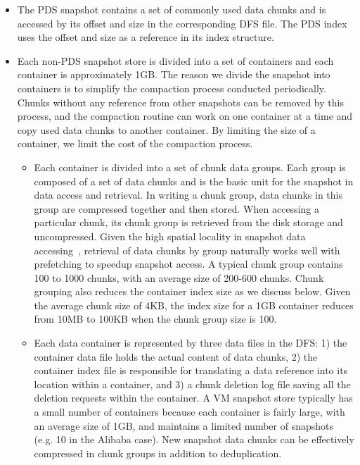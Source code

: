 \begin{itemize}
\item The PDS snapshot contains a set of commonly used data chunks and is accessed by its offset and size
in the corresponding DFS file.
The PDS index uses the offset and size as a reference in its index structure.
 
\item Each non-PDS snapshot store is divided into a set of containers and each container is approximately 
1GB. The reason we divide the snapshot into containers is to simplify the compaction process
conducted periodically. Chunks without any reference from other snapshots can be removed by this process, and the compaction  routine can work on one container at a time
and copy used data chunks to another container. By limiting the size of a container, we limit the cost of the compaction process.
	\begin{itemize}
	\item Each container is divided into a set of chunk data groups. Each group is composed of
	a set of data chunks and is the basic unit for the snapshot in data access and retrieval. 
	In writing a chunk group, data chunks in this group are compressed together and then stored. 
	When accessing a particular chunk, its chunk group is retrieved from the disk storage
	and uncompressed. Given the high spatial locality 
in snapshot data accessing~\cite{Sampling,FoundationPaper},
	retrieval of  data chunks by group naturally works well with prefetching to speedup
	snapshot access. A  typical chunk group contains 100 to 1000 chunks, with an average size of 
200-600 chunks.
Chunk grouping also reduces the  container index size as we discuss below. 
Given  the average chunk size of 4KB,  the index size for a 1GB container reduces from 10MB to 100KB when
the chunk group size is 100.
	\item 
Each data container is represented by three data files in the DFS:
1) the container data file holds the actual content of data chunks, 
2) the container index file is responsible for translating a data reference
into its location within a container, and 
3) a chunk deletion log file saving all the deletion requests within  the container.
A VM snapshot store typically has a small number of containers because each container is fairly large, with an average size of 1GB, and 
maintains a limited number of snapshots (e.g. 10 in the Alibaba case).
New snapshot data chunks can be effectively compressed in chunk groups in addition to  deduplication.


\end{itemize}
\end{itemize}
